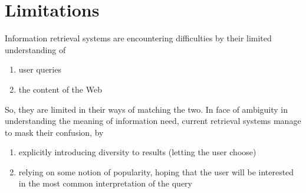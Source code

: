 


\section {Limitations} 

Information retrieval systems are encountering difficulties by their limited understanding of 
\begin{enumerate}
\item{user queries}
\item{the content of the Web}
\end{enumerate}
So, they are limited in their ways of matching the two. In face of ambiguity in understanding the meaning of information need, current retrieval systems manage to mask their confusion, by 

\begin{enumerate}
\item{explicitly introducing diversity to results (letting the user choose)}
\item{relying on some notion of popularity, hoping that the user will be interested in the most common interpretation of the query}
\end{enumerate}


